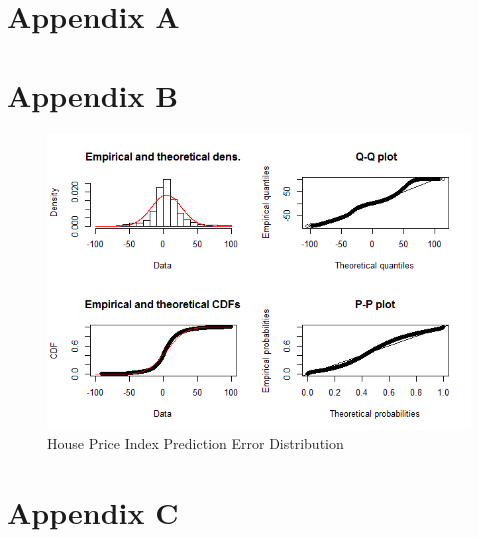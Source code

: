 \documentclass[AEJ,reqno, draftmode]{AEA} %
\begin{document}
\appendix

\section{Appendix A}

\renewcommand{\thetable}{A\arabic{table}}


\restoregeometry 



\restoregeometry 


\clearpage

\section{Appendix B}

\begin{figure}[!htb]
    \centering
     \includegraphics[width=\columnwidth]{Figures/Rplot_qqplot.png} \par
 \caption{House Price Index Prediction Error Distribution}
 \label{fig:Rplot_ssd_err_10}
\end{figure}

%
\clearpage


\section{Appendix C}
\end{document}
